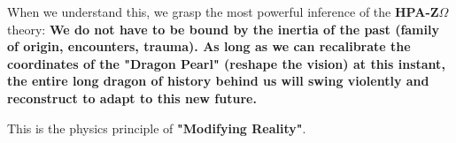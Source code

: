 When we understand this, we grasp the most powerful inference of the \textbf{HPA-Z$\Omega$} theory: \textbf{We do not have to be bound by the inertia of the past (family of origin, encounters, trauma). As long as we can recalibrate the coordinates of the "Dragon Pearl" (reshape the vision) at this instant, the entire long dragon of history behind us will swing violently and reconstruct to adapt to this new future.}

This is the physics principle of \textbf{"Modifying Reality"}.

